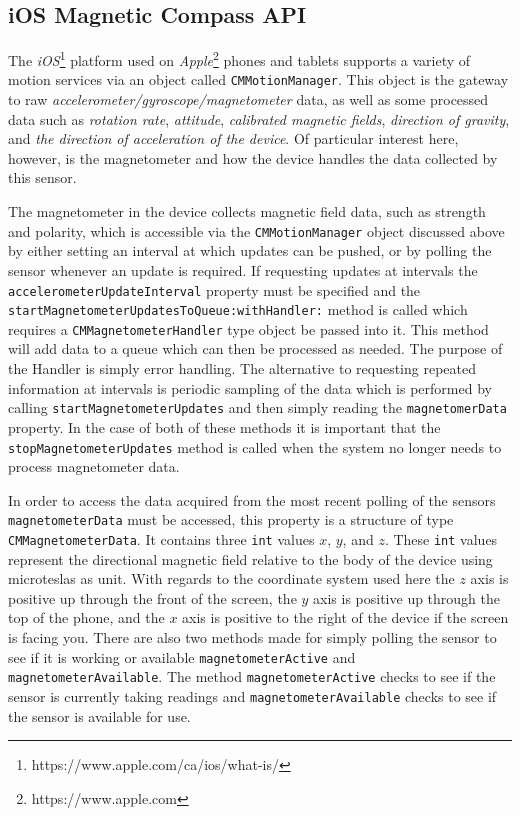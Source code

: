 \documentclass[paper=letter, fontsize=11pt]{scrartcl}
\numberwithin{equation}{section}
\numberwithin{figure}{section}
\numberwithin{table}{section}
\begin{document}
\subsection{iOS Magnetic Compass API}
\label{sec:ios_compass_api}
\par
The {\em iOS}\footnote{https://www.apple.com/ca/ios/what-is/} platform used on
{\em Apple}\footnote{https://www.apple.com} phones and tablets supports a
variety of motion services via an object called \texttt{CMMotionManager}. This
object is the gateway to raw {\em accelerometer/gyroscope/magnetometer} data,
as well as some processed data such as {\em rotation rate}, {\em attitude},
{\em calibrated magnetic fields}, {\em direction of gravity}, and {\em the
direction of acceleration of the device}.
Of particular interest here, however, is the magnetometer and how the device
handles the data collected by this sensor.

\par
The magnetometer in the device collects magnetic field data, such as strength
and polarity, which is accessible via the \texttt{CMMotionManager} object
discussed above by either setting an interval at which updates can be pushed,
or by polling the sensor whenever an update is required. If requesting updates
at intervals the \texttt{accelerometerUpdateInterval} property must be specified
and the \texttt{startMagnetometerUpdatesToQueue:withHandler:} method is called
which requires a \texttt{CMMagnetometerHandler} type object be passed into it.
This method will add data to a queue which can then be processed as needed. The
purpose of the Handler is simply error handling. The alternative to requesting
repeated information at intervals is periodic sampling of the data which is
performed by calling \texttt{startMagnetometerUpdates} and then simply reading
the \texttt{magnetomerData} property. In the case of both of these methods it
is important that the \texttt{stopMagnetometerUpdates} method is called when
the system no longer needs to process magnetometer data. 

\par
In order to access the data acquired from the most recent polling of the
sensors\\
\texttt{magnetometerData} must be accessed, this property is a structure of type
\texttt{CMMagnetometerData}. It contains three \texttt{int} values $x$, $y$, and
$z$. These \texttt{int} values represent the directional magnetic field relative
to the body of the device using microteslas as unit. With regards to the
coordinate system used here the $z$ axis is positive up through the front of the
screen, the $y$ axis is positive up through the top of the phone, and the $x$
axis is positive to the right of the device if the screen is facing you. There
are also two methods made for simply polling the sensor to see if it is working
or available \texttt{magnetometerActive} and \texttt{magnetometerAvailable}. The
method \texttt{magnetometerActive} checks to see if the sensor is currently
taking readings and \texttt{magnetometerAvailable} checks to see if the sensor
is available for use.
\end{document}

